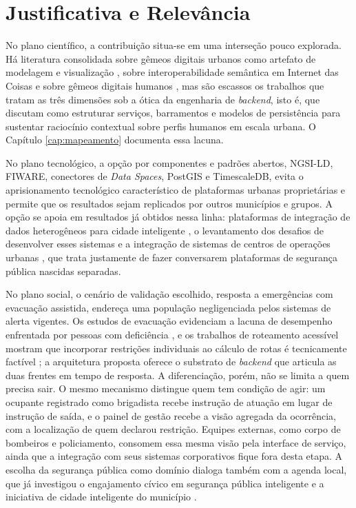 \section{Justificativa e Relevância}
\label{sec:justificativa}

No plano científico, a contribuição situa-se em uma interseção pouco explorada. Há literatura consolidada sobre gêmeos digitais urbanos como artefato de modelagem e visualização \cite{ketzler2020digital,shahat2021city,lehtola2022digital}, sobre interoperabilidade semântica em Internet das Coisas \cite{ganzha2017semantic,komninos2016smart,qamar2019smart} e sobre gêmeos digitais humanos \cite{asad2023human,okegbile2022edge,fontes2024human}, mas são escassos os trabalhos que tratam as três dimensões sob a ótica da engenharia de \textit{backend}, isto é, que discutam como estruturar serviços, barramentos e modelos de persistência para sustentar raciocínio contextual sobre perfis humanos em escala urbana. O Capítulo \ref{cap:mapeamento} documenta essa lacuna.

No plano tecnológico, a opção por componentes e padrões abertos, NGSI-LD, FIWARE, conectores de \textit{Data Spaces}, PostGIS e TimescaleDB, evita o aprisionamento tecnológico característico de plataformas urbanas proprietárias e permite que os resultados sejam replicados por outros municípios e grupos. A opção se apoia em resultados já obtidos nessa linha: plataformas de integração de dados heterogêneos para cidade inteligente \cite{pereira2022platform,souza2018geographic}, o levantamento dos desafios de desenvolver esses sistemas \cite{cavalcante2017challenges} e a integração de sistemas de centros de operações urbanas \cite{loss2024integrating}, que trata justamente de fazer conversarem plataformas de segurança pública nascidas separadas.

No plano social, o cenário de validação escolhido, resposta a emergências com evacuação assistida, endereça uma população negligenciada pelos sistemas de alerta vigentes. Os estudos de evacuação evidenciam a lacuna de desempenho enfrentada por pessoas com deficiência \cite{hashemi2018emergency}, e os trabalhos de roteamento acessível mostram que incorporar restrições individuais ao cálculo de rotas é tecnicamente factível \cite{deng2022semantic,allahbakhshi2026zuriact}; a arquitetura proposta oferece o substrato de \textit{backend} que articula as duas frentes em tempo de resposta. A diferenciação, porém, não se limita a quem precisa sair. O mesmo mecanismo distingue quem tem condição de agir: um ocupante registrado como brigadista recebe instrução de atuação em lugar de instrução de saída, e o painel de gestão recebe a visão agregada da ocorrência, com a localização de quem declarou restrição. Equipes externas, como corpo de bombeiros e policiamento, consomem essa mesma visão pela interface de serviço, ainda que a integração com seus sistemas corporativos fique fora desta etapa. A escolha da segurança pública como domínio dialoga também com a agenda local, que já investigou o engajamento cívico em segurança pública inteligente \cite{moreira2017towards} e a iniciativa de cidade inteligente do município \cite{cacho2016smart}.

